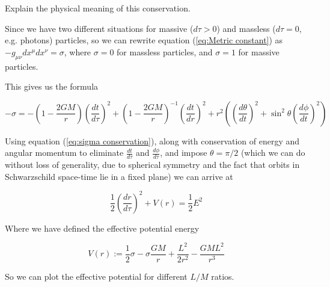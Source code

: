  Explain the physical meaning of this conservation.

Since we have two different situations for massive ($d\tau >0$) and massless ($d\tau=0$, e.g. photons) particles, so we can rewrite equation (\ref{eq:Metric constant}) as $- g_{\mu \nu} dx^{\mu} dx^{\nu} = \sigma$, where $\sigma = 0$ for massless particles, and $\sigma = 1$ for massive particles.

This gives us the formula

\begin{equation}
    -\sigma = - (1-\frac{2 G M}{r}) (\frac{dt}{d\tau})^2 +  (1-\frac{2 G M}{r})^{-1} (\frac{dt}{dr})^2
            + r^2 ((\frac{d\theta}{dt})^2+\sin^2\theta (\frac{d\phi}{dt})^2)
\label{eq:sigma conservation}
\end{equation}


Using equation (\ref{eq:sigma conservation}), along with conservation of energy and angular momentum to eliminate $\frac{dt}{d\tau}$ and $\frac{d\phi}{d\tau}$, and impose $\theta=\pi / 2$ (which we can do without loss of generality, due to spherical symmetry and the fact that orbits in Schwarzschild space-time lie in a fixed plane) we can arrive at

\begin{equation}
    \frac{1}{2} \left(\frac{dr}{d\tau}\right)^2
    + V\left(r\right) = \frac{1}{2} E^2
\label{eq:conservation of E Schwarzschild}
\end{equation}

Where we have defined the effective potential energy

\begin{equation}
    V\left(r\right) := \frac{1}{2} \sigma - \sigma \frac{G M}{r} + \frac{L^2}{2 r^2} - \frac{G M L^2}{r^3}
\label{eq:effective potential schwarzschild}
\end{equation}

So we can plot the effective potential for different $L/M$ ratios.

